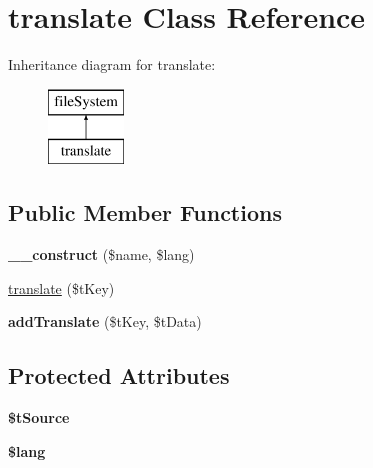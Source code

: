 \hypertarget{classtranslate}{\section{translate Class Reference}
\label{classtranslate}
}
Inheritance diagram for translate\-:\begin{figure}[H]
\begin{center}
\leavevmode
\includegraphics[height=2.000000cm]{classtranslate}
\end{center}
\end{figure}
\subsection*{Public Member Functions}
\begin{DoxyCompactItemize}
\item 
\hypertarget{classtranslate_afa2489379aace6afacf1391038f04fed}{{\bfseries \-\_\-\-\_\-construct} (\$name, \$lang)}\label{classtranslate_afa2489379aace6afacf1391038f04fed}

\item 
\hyperlink{classtranslate_a413ddf994d1d740bb68c2fecfa47e68e}{translate} (\$t\-Key)
\item 
\hypertarget{classtranslate_a2df21f2e384deb0f4f0f42c0ecd069ba}{{\bfseries add\-Translate} (\$t\-Key, \$t\-Data)}\label{classtranslate_a2df21f2e384deb0f4f0f42c0ecd069ba}

\end{DoxyCompactItemize}
\subsection*{Protected Attributes}
\begin{DoxyCompactItemize}
\item 
\hypertarget{classtranslate_a9a663ee008f29e190f7a56c35ae011db}{{\bfseries \$t\-Source}}\label{classtranslate_a9a663ee008f29e190f7a56c35ae011db}

\item 
\hypertarget{classtranslate_a7714b111b644017933931ec69a154102}{{\bfseries \$lang}}\label{classtranslate_a7714b111b644017933931ec69a154102}

\end{DoxyCompactItemize}
